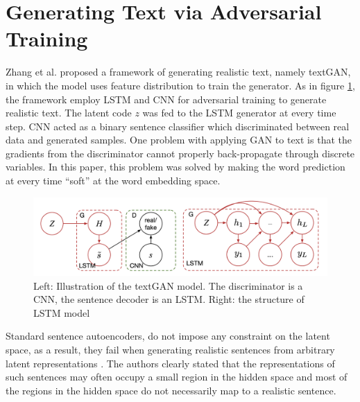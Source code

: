 \documentclass[letterpaper,12pt]{article}
\begin{document}
\section{Generating Text via Adversarial Training}
 Zhang et al.\cite{Zhang2016GeneratingTraining} proposed a framework of generating realistic text, namely textGAN, in which the model uses feature distribution to train the generator. As in figure \ref{fig:textGAN}, the framework employ LSTM and CNN for adversarial training to generate realistic text. The latent code $z$ was fed to the LSTM generator at every time step. CNN acted as a binary sentence classifier which discriminated between real data and generated samples. One problem with applying GAN to text is that the gradients from the discriminator cannot properly back-propagate through discrete variables. In this paper, this problem was solved by making the word prediction at every time “soft” at the word embedding space.
 
 \begin{figure}
    \centering
    \includegraphics[width=\1\columnwidth]{literature_surveys2/textGAN.png}
    \caption{Left: Illustration of the textGAN model. The discriminator is a CNN, the sentence decoder is an LSTM. Right: the structure of LSTM model}
    \label{fig:textGAN}
\end{figure}

Standard sentence autoencoders, do not impose any constraint on the latent space, as a result, they fail when generating realistic sentences from arbitrary latent representations \cite{Bowman2015GeneratingSpace}. The authors clearly stated that the representations of such sentences may often occupy a small region in the hidden space and most of the regions in the hidden space do not necessarily map to a realistic sentence.
\end{document}
